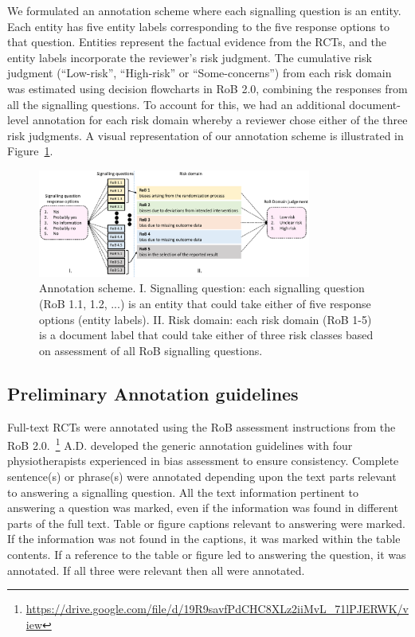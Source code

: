 \documentclass{IOS-Book-Article}
\begin{document}
We formulated an annotation scheme where each signalling question is an entity.
Each entity has five entity labels corresponding to the five response options to that question.
Entities represent the factual evidence from the RCTs, and the entity labels incorporate the reviewer's risk judgment.
The cumulative risk judgment (``Low-risk'', ``High-risk'' or ``Some-concerns'') from each risk domain was estimated using decision flowcharts in RoB 2.0, combining the responses from all the signalling questions.
To account for this, we had an additional document-level annotation for each risk domain whereby a reviewer chose either of the three risk judgments.
A visual representation of our annotation scheme is illustrated in Figure~\ref{fig:ann_scheme}.
%
\begin{figure}[!htbp]
    \centering
    \includegraphics[width=0.80\textwidth]{Figures/annotation_scheme.pdf}
    \caption{Annotation scheme. I. Signalling question: each signalling question (RoB 1.1, 1.2, ...) is an entity that could take either of five response options (entity labels). II. Risk domain: each risk domain (RoB 1-5) is a document label that could take either of three risk classes based on assessment of all RoB signalling questions.}
    \label{fig:ann_scheme}
\end{figure}
%
%
%
\subsection{Preliminary Annotation guidelines}
\label{subsec:annot_guide}
%
Full-text RCTs were annotated using the RoB assessment instructions from the RoB 2.0.~\footnote{\url{https://drive.google.com/file/d/19R9savfPdCHC8XLz2iiMvL_71lPJERWK/view}}
A.D. developed the generic annotation guidelines with four physiotherapists experienced in bias assessment to ensure consistency.
Complete sentence(s) or phrase(s) were annotated depending upon the text parts relevant to answering a signalling question.
All the text information pertinent to answering a question was marked, even if the information was found in different parts of the full text.
Table or figure captions relevant to answering were marked.
If the information was not found in the captions, it was marked within the table contents.
If a reference to the table or figure led to answering the question, it was annotated.
If all three were relevant then all were annotated.
%
\end{document}
